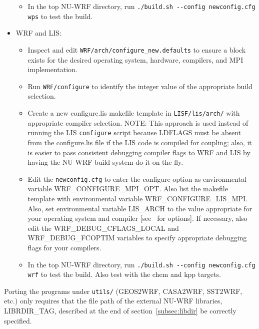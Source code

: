 \begin{itemize}
\begin{itemize}
  \item In the top NU-WRF directory, run 
    \texttt{./build.sh -\--config \mbox{newconfig.cfg} wps} to test the 
    build.

  \end{itemize}

\item WRF and LIS:
  \begin{itemize}

  \item Inspect and edit \texttt{WRF/arch/configure\_new.defaults} to ensure
    a block exists for the desired operating system, hardware, compilers, 
    and MPI implementation.

  \item Run \texttt{WRF/configure} to identify the integer value of the 
    appropriate build selection.

  \item Create a new configure.lis makefile template in 
    \texttt{LISF/lis/arch/} with appropriate compiler selection. NOTE:
    This approach is used instead of running the LIS \texttt{configure} 
    script because LDFLAGS must be absent from the configure.lis
    file if the LIS code is compiled for coupling; also, it is easier
    to pass consistent debugging compiler flags to WRF and LIS by 
    having the NU-WRF build system do it on the fly.

  \item Edit the \texttt{newconfig.cfg} to enter the configure option as
    environmental variable WRF\_CONFIGURE\_MPI\_OPT.
    Also list the makefile template with environmental variable 
    WRF\_CONFIGURE\_LIS\_MPI.  Also, set environmental 
    variable LIS\_ARCH to the value appropriate for your operating system
    and compiler [see~\cite{ref:LisUserGuide} for options].  If necessary,
    also edit the WRF\_DEBUG\_CFLAGS\_LOCAL and WRF\_DEBUG\_FCOPTIM
    variables to specify appropriate debugging flags for your compilers.

  \item In the top NU-WRF directory, run 
    \texttt{./build.sh -\--config \mbox{newconfig.cfg} wrf} to test the 
    build. Also test with the chem and kpp targets.

  \end{itemize}

\end{itemize}

Porting the programs under \texttt{utils/} (GEOS2WRF, CASA2WRF, SST2WRF, etc.) only
requires that the file path of the external NU-WRF libraries, LIBRDIR\_TAG, described at the end of 
section~\ref{subsec:libdir} be correctly specified. 
